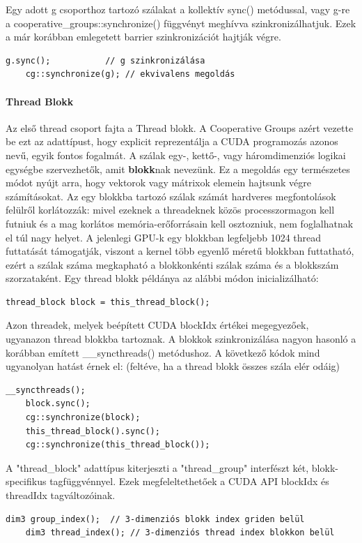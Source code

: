 Egy adott g csoporthoz tartozó szálakat a kollektív sync() metódussal, vagy g-re a cooperative\_groups::synchronize() függvényt meghívva szinkronizálhatjuk. Ezek a már korábban emlegetett barrier szinkronizációt hajtják végre.
\begin{lstlisting}[style=CStyle]
	g.sync();           // g szinkronizálása
	cg::synchronize(g); // ekvivalens megoldás
\end{lstlisting}

\paragraph{Thread Blokk}
Az első thread csoport fajta a Thread blokk. A Cooperative Groups azért vezette be ezt az adattípust, hogy explicit reprezentálja a CUDA programozás azonos nevű, egyik fontos fogalmát. A szálak egy-, kettő-, vagy háromdimenziós logikai egységbe szervezhetők, amit \textbf{blokk}nak nevezünk. Ez a megoldás egy természetes módot nyújt arra, hogy vektorok vagy mátrixok elemein hajtsunk végre számításokat. 
Az egy blokkba tartozó szálak számát hardveres megfontolások felülről korlátozzák: mivel ezeknek a threadeknek közös processzormagon kell futniuk és a mag korlátos memória-erőforrásain kell osztozniuk, nem foglalhatnak el túl nagy helyet. A jelenlegi GPU-k egy blokkban legfeljebb 1024 thread futtatását támogatják, viszont a kernel több egyenlő méretű blokkban futtatható, ezért a szálak száma megkapható a blokkonkénti szálak száma és a blokkszám szorzataként. \cite{kvantum_optim}
Egy thread blokk példánya az alábbi módon inicializálható:
\begin{lstlisting}[style=CStyle]
	thread_block block = this_thread_block();
\end{lstlisting}

Azon threadek, melyek beépített CUDA blockIdx értékei megegyezőek, ugyanazon thread blokkba tartoznak. A blokkok szinkronizálása nagyon hasonló a korábban emített \_\_syncthreads() metódushoz. A következő kódok mind ugyanolyan hatást érnek el: (feltéve, ha a thread blokk összes szála elér odáig)
\begin{lstlisting}[style=CStyle]
	__syncthreads();
	block.sync();
	cg::synchronize(block);
	this_thread_block().sync();
	cg::synchronize(this_thread_block());
\end{lstlisting}

A "thread\_block" adattípus kiterjeszti a "thread\_group" interfészt két, blokk-specifikus tagfüggvénnyel. Ezek megfeleltethetőek a CUDA API blockIdx és threadIdx tagváltozóinak.
\begin{lstlisting}[style=CStyle]
	dim3 group_index();  // 3-dimenziós blokk index griden belül
	dim3 thread_index(); // 3-dimenziós thread index blokkon belül
\end{lstlisting}




